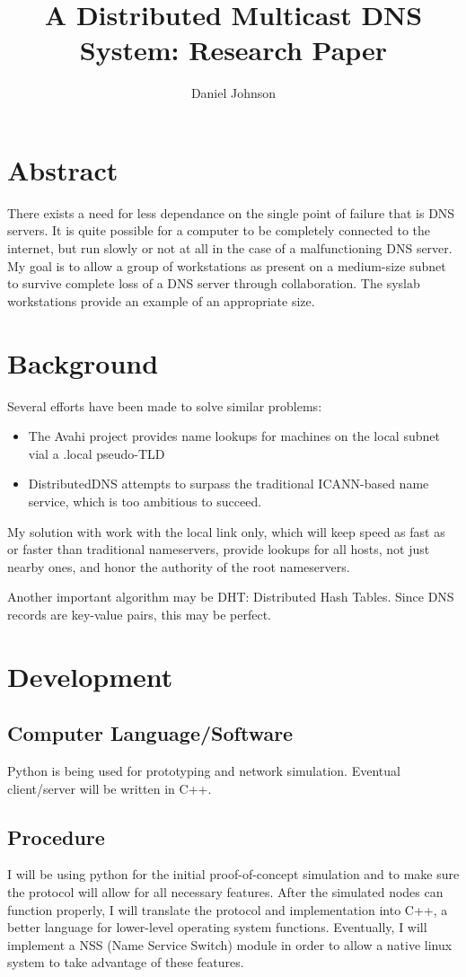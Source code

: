 \documentclass[12pt,letterpaper,titlepage]{article}
\begin{document}
\author{Daniel Johnson}
\title{A Distributed Multicast DNS System: Research Paper}
\maketitle
\section{Abstract}
There exists a need for less dependance on the single point of failure that is DNS servers. It is quite possible for a computer to be completely connected to the internet, but run slowly or not at all in the case of a malfunctioning DNS server. My goal is to allow a group of workstations as present on a medium-size subnet to survive complete loss of a DNS server through collaboration. The syslab workstations provide an example of an appropriate size.
\section{Background}
Several efforts have been made to solve similar problems:
\begin{itemize}
\item The Avahi project provides name lookups for machines on the local subnet vial a .local pseudo-TLD
\item DistributedDNS attempts to surpass the traditional ICANN-based name service, which is too ambitious to succeed.
\end{itemize}
My solution with work with the local link only, which will keep speed as fast as or faster than traditional nameservers, provide lookups for all hosts, not just nearby ones, and honor the authority of the root nameservers.

Another important algorithm may be DHT: Distributed Hash Tables. Since DNS records are key-value pairs, this may be perfect.
\section{Development}
\subsection{Computer Language/Software}
Python is being used for prototyping and network simulation. Eventual client/server will be written in C++.
\subsection{Procedure}
I will be using python for the initial proof-of-concept simulation and to make sure the protocol will allow for all necessary features. After the simulated nodes can function properly, I will translate the protocol and implementation into C++, a better language for lower-level operating system functions. Eventually, I will implement a NSS (Name Service Switch) module in order to allow a native linux system to take advantage of these features.
\end{document}
